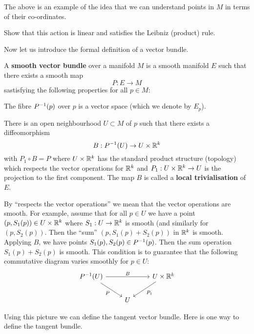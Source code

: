 \begin{rmk}
  The above is an example of the idea that we can understand points in $M$ in terms of their co-ordinates.
\end{rmk}

\begin{exer}
  Show that this action is linear and satisfies the Leibniz (product) rule.
\end{exer}

Now let us introduce the formal definition of a vector bundle.

\begin{defn}[2.11]
  A \textbf{smooth vector bundle} over a manifold $M$ is a smooth manifold $E$ such that there exists a smooth map
  \[ P: E \to M \]
  sastisfying the following properties for all $p \in M$:
  \begin{itm}
    \io
    The fibre $P^{-1}(p)$ over $p$ is a vector space (which we denote by $E_p$).

    \io
    There is an open neighbourhood $U \subset M$ of $p$ such that there exists a diffeomorphism
    \[ B: P^{-1}(U) \to U \times \mathbb{R}^k \]
    with $P_1 \circ B = P$ where $U \times \mathbb{R}^k$ has the standard product structure (topology) which respects the vector operations for $\mathbb{R}^k$ and $P_1: U \times \mathbb{R}^k \to U$ is the projection to the first component.
    The map $B$ is called a \textbf{local trivialisation} of $E$.
  \end{itm}

  By ``respects the vector operations'' we mean that the vector operations are smooth.
  For example, assume that for all $p \in U$ we have a point $(p,S_1(p)) \in U \times \mathbb{R}^k$ where $S_1: U \to \mathbb{R}^k$ is smooth (and similarly for $(p,S_2(p))$.
  Then the ``sum'' $(p, S_1(p)+S_2(p))$ in $\mathbb{R}^k$ is smooth.
  Applying $B$, we have points $S_1(p), S_2(p) \in P^{-1}(p)$.
  Then the sum operation $S_1(p)+S_2(p)$ is smooth.
  This condition is to guarantee that the following commutative diagram varies smoothly for $p \in U$:
  \begin{equation*}
    \begin{tikzcd}
      P\inv(U) \ar[rd, "P"'] \ar[rr, "B"] & & U \times \RR^k \ar[ld, "P_1"] \\
      & U &
    \end{tikzcd}
  \end{equation*}
\end{defn}

Using this picture we can define the tangent vector bundle.
Here is one way to define the tangent bundle.

